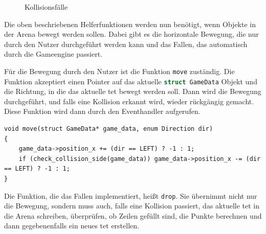 \documentclass[11pt]{article}
\newcommand{\lstin}[1]{\lstinline[language=C]{#1}}
\begin{document}
\begin{figure}[h]
  \centering
  \hspace{40px}
  \hspace{40px}
  \caption{Kollisionsfälle}
\end{figure}

Die oben beschriebenen Helferfunktionen werden nun benötigt, wenn Objekte in der Arena bewegt werden sollen.
Dabei gibt es die horizontale Bewegung, die nur durch den Nutzer durchgeführt werden kann und das Fallen, 
das automatisch durch die Gameengine passiert.

Für die Bewegung durch den Nutzer ist die Funktion \lstin{move} zuständig. 
Die Funktion akzeptiert einen Pointer auf das aktuelle \lstin{struct GameData} Objekt und die Richtung, in die das aktuelle \gls{tet} bewegt werden soll.
Dann wird die Bewegung durchgeführt, und falls eine Kollision erkannt wird, wieder rückgängig gemacht. 
Diese Funktion wird dann durch den Eventhandler aufgerufen.
\begin{lstlisting}
void move(struct GameData* game_data, enum Direction dir)
{
    game_data->position_x += (dir == LEFT) ? -1 : 1;
    if (check_collision_side(game_data)) game_data->position_x -= (dir == LEFT) ? -1 : 1;
}  
\end{lstlisting}

Die Funktion, die das Fallen implementiert, heißt \lstin{drop}.
Sie übernimmt nicht nur die Bewegung, sondern muss auch, falls eine Kollision passiert, das aktuelle \gls{tet}
in die Arena schreiben, überprüfen, ob Zeilen gefüllt sind, die Punkte berechnen und dann gegebenenfalls ein neues \gls{tet} erstellen.
\end{document}
